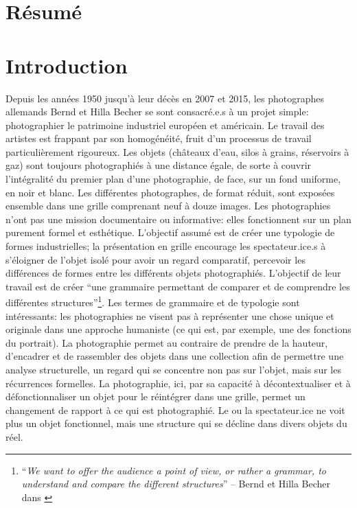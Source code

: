 
\frontmatter
\chapter*{Résumé}


\mainmatter
\chapter*{Introduction}
Depuis les années 1950 jusqu'à leur décès en 2007 et 2015, les photographes allemands Bernd et Hilla Becher se sont consacré.e.s à un projet simple: photographier le patrimoine industriel européen et américain. Le travail des artistes est frappant par son homogénéité, fruit d'un processus de travail particulièrement rigoureux. Les objets (châteaux d'eau, silos à grains, réservoirs à gaz) sont toujours photographiés à une distance égale, de sorte à couvrir l'intégralité du premier plan d'une photographie, de face, sur un fond uniforme, en noir et blanc. Les différentes photographes, de format réduit, sont exposées ensemble dans une grille comprenant neuf à douze images. Les photographies n'ont pas une mission documentaire ou informative: elles fonctionnent sur un plan purement formel et esthétique. L'objectif assumé est de créer une typologie de formes industrielles; la présentation en grille encourage les spectateur.ice.s à s'éloigner de l'objet isolé pour avoir un regard comparatif, percevoir les différences de formes entre les différents objets photographiés. L'objectif de leur travail est de créer \enquote{une grammaire permettant de comparer et de comprendre les différentes structures}\footnote{
	\enquote{\textit{We want to offer the audience a point of view, or rather a grammar, to understand and compare the different structures}} -- Bernd et Hilla Becher dans \cite{stimson_photographic_2004}
}. Les termes de grammaire et de typologie sont intéressants: les photographies ne visent pas à représenter une chose unique et originale dans une approche humaniste (ce qui est, par exemple, une des fonctions du portrait). La photographie permet au contraire de prendre de la hauteur, d'encadrer et de rassembler des objets dans une collection afin de permettre une analyse structurelle, un regard qui se concentre non pas sur l'objet, mais sur les récurrences formelles. La photographie, ici, par sa capacité à décontextualiser et à défonctionnaliser un objet pour le réintégrer dans une grille, permet un changement de rapport à ce qui est photographié. Le ou la spectateur.ice ne voit plus un objet fonctionnel, mais une structure qui se décline dans divers objets du réel.

